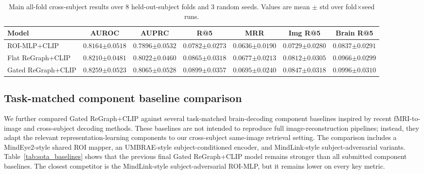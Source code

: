 \documentclass{article}
\begin{document}
\begin{table}[!htbp]
  \centering
  \caption{Main all-fold cross-subject results over 8 held-out-subject folds and 3 random seeds. Values are mean $\pm$ std over fold$\times$seed runs.}
  \label{tab:cross_subject_main}
  \scriptsize
  \setlength{\tabcolsep}{3.5pt}
  \renewcommand{\arraystretch}{1.15}
  \begin{tabular}{lcccccc}
    \toprule
    Model & AUROC & AUPRC & R@5 & MRR & Img R@5 & Brain R@5 \\
    \midrule
    ROI-MLP+CLIP
    & $0.8164{\scriptstyle\pm0.0518}$
    & $0.7896{\scriptstyle\pm0.0532}$
    & $0.0782{\scriptstyle\pm0.0273}$
    & $0.0636{\scriptstyle\pm0.0190}$
    & $0.0729{\scriptstyle\pm0.0280}$
    & $0.0837{\scriptstyle\pm0.0291}$ \\
    Flat ReGraph+CLIP
    & $0.8210{\scriptstyle\pm0.0481}$
    & $0.8022{\scriptstyle\pm0.0460}$
    & $0.0865{\scriptstyle\pm0.0318}$
    & $0.0677{\scriptstyle\pm0.0213}$
    & $0.0812{\scriptstyle\pm0.0305}$
    & $0.0966{\scriptstyle\pm0.0299}$ \\
    Gated ReGraph+CLIP
    & $\mathbf{0.8259}{\scriptstyle\pm0.0523}$
    & $\mathbf{0.8065}{\scriptstyle\pm0.0528}$
    & $\mathbf{0.0899}{\scriptstyle\pm0.0357}$
    & $\mathbf{0.0695}{\scriptstyle\pm0.0240}$
    & $\mathbf{0.0847}{\scriptstyle\pm0.0318}$
    & $\mathbf{0.0996}{\scriptstyle\pm0.0310}$ \\
    \bottomrule
  \end{tabular}
\end{table}

\subsection{Task-matched component baseline comparison}

We further compared Gated ReGraph+CLIP against several task-matched brain-decoding component baselines inspired by recent fMRI-to-image and cross-subject decoding methods. These baselines are not intended to reproduce full image-reconstruction pipelines; instead, they adapt the relevant representation-learning components to our cross-subject same-image retrieval setting. The comparison includes a MindEye2-style shared ROI mapper, an UMBRAE-style subject-conditioned encoder, and MindLink-style subject-adversarial variants. Table~\ref{tab:sota_baselines} shows that the previous final Gated ReGraph+CLIP model remains stronger than all submitted component baselines. The closest competitor is the MindLink-style subject-adversarial ROI-MLP, but it remains lower on every key metric.
\end{document}
